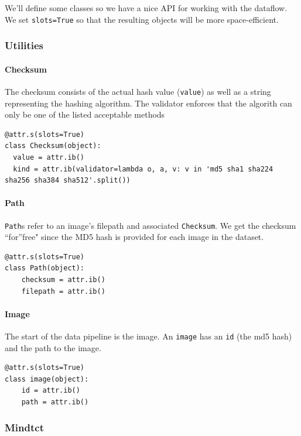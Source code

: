 We'll define some classes so we have a nice API for working with the
dataflow. We set \texttt{slots=True} so that the resulting objects will
be more space-efficient.

\subsubsection{Utilities}\label{utilities}

\paragraph{Checksum}\label{checksum}

The checksum consists of the actual hash value (\texttt{value}) as well
as a string representing the hashing algorithm. The validator enforces
that the algorith can only be one of the listed acceptable methods

\begin{lstlisting}
@attr.s(slots=True)
class Checksum(object):
  value = attr.ib()
  kind = attr.ib(validator=lambda o, a, v: v in 'md5 sha1 sha224 sha256 sha384 sha512'.split())
\end{lstlisting}

\paragraph{Path}\label{path}

\texttt{Path}s refer to an image's filepath and associated
\texttt{Checksum}. We get the checksum ``for''free" since the MD5 hash
is provided for each image in the dataset.

\begin{lstlisting}
@attr.s(slots=True)
class Path(object):
    checksum = attr.ib()
    filepath = attr.ib()
\end{lstlisting}

\paragraph{Image}\label{image}

The start of the data pipeline is the image. An \texttt{image} has an
\texttt{id} (the md5 hash) and the path to the image.

\begin{lstlisting}
@attr.s(slots=True)
class image(object):
    id = attr.ib()
    path = attr.ib()
\end{lstlisting}

\subsubsection{Mindtct}\label{mindtct}

